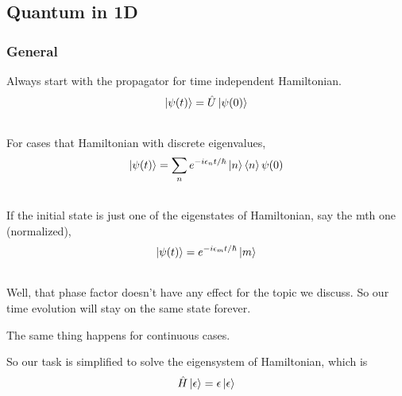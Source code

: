 \documentclass[letterpaper,10pt,english]{sphinxmanual}
\begin{document}
\subsection{Quantum in 1D}
\label{QuantumMechanics:quantum-in-1d}

\subsubsection{General}
\label{QuantumMechanics:general}
Always start with the propagator for time independent Hamiltonian.
\begin{gather}
\begin{split}\ket{\psi(t)} = \hat U \ket{\psi(0)}\end{split}\notag\\\begin{split}\end{split}\notag
\end{gather}
For cases that Hamiltonian with discrete eigenvalues,
\begin{gather}
\begin{split}\ket{\psi(t)} = \sum _ n e^{-i \epsilon _ n t/ \hbar } \ket{n}\braket{n}{\psi(0)}\end{split}\notag\\\begin{split}\end{split}\notag
\end{gather}
If the initial state is just one of the eigenstates of Hamiltonian, say the mth one (normalized),
\begin{gather}
\begin{split}\ket{\psi(t)} = e^{- i \epsilon _ m t/\hbar} \ket{ m }\end{split}\notag\\\begin{split}\end{split}\notag
\end{gather}
Well, that phase factor doesn't have any effect for the topic we discuss. So our time evolution will stay on the same state forever.

The same thing happens for continuous cases.

So our task is simplified to solve the eigensystem of Hamiltonian, which is
\begin{gather}
\begin{split}\hat H \ket{\epsilon} = \epsilon \ket{\epsilon}\end{split}\notag\\\begin{split}\end{split}\notag
\end{gather}
\end{document}
